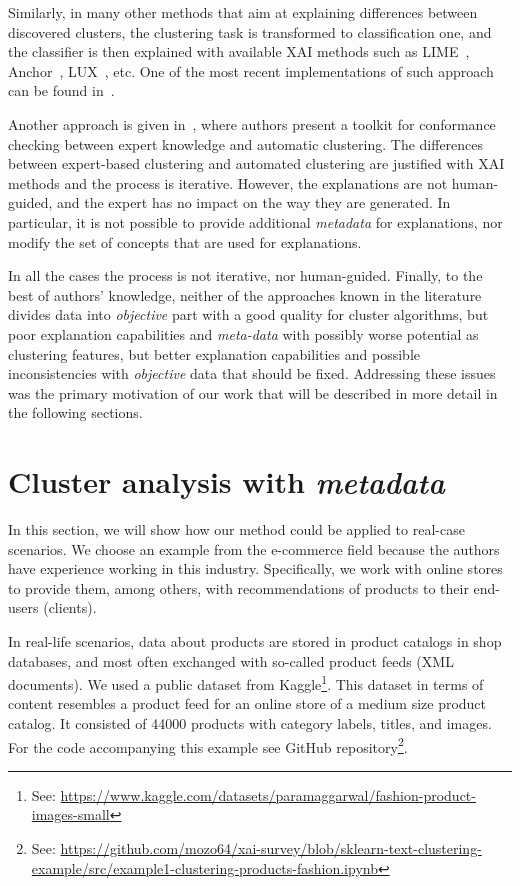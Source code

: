 \documentclass[
 twocolumn,
 hf,
]{ceurart}
\begin{document}
Similarly, in many other methods that aim at explaining differences between discovered clusters, the clustering task is transformed to classification one, and the classifier is then explained with available XAI methods such as LIME~\cite{lime}, Anchor~\cite{anchor}, LUX~\cite{lux2021iccs}, etc.
One of the most recent implementations of such approach can be found in~\cite{xaiclust2021}.

Another approach is given in~\cite{knac2021arxiv}, where authors present a toolkit for conformance checking between expert knowledge and automatic clustering.
The differences between expert-based clustering and automated clustering are justified with XAI methods and the process is iterative.
However, the explanations are not human-guided, and the expert has no impact on the way they are generated.
In particular, it is not possible to provide additional \textit{metadata} for explanations, nor modify the set of concepts that are used for explanations.

In all the cases the process is not iterative, nor human-guided.
Finally, to the best of authors' knowledge, neither of the approaches known in the literature divides data into \textit{objective} part with a good quality for cluster algorithms, but poor explanation capabilities and \textit{meta-data} with possibly worse potential as clustering features, but better explanation capabilities and possible inconsistencies with \textit{objective} data that should be fixed.
Addressing these issues was the primary motivation of our work that will be described in more detail in the following sections.

\section{Cluster analysis with \textit{metadata}}
\label{sec:clumeta}
In this section, we will show how our method could be applied to real-case scenarios.
We choose an example from the e-commerce field because the authors have experience working in this industry.
Specifically, we work with online stores to provide them, among others, with recommendations of products to their end-users (clients).

In real-life scenarios, data about products are stored in product catalogs in shop databases, and most often exchanged with so-called product feeds (XML documents).
We used a public dataset from Kaggle\footnote{See: \url{https://www.kaggle.com/datasets/paramaggarwal/fashion-product-images-small}}.
This dataset in terms of content resembles a product feed for an online store of a medium size product catalog.
It consisted of 44000 products with category labels, titles, and images.
For the code accompanying this example see GitHub repository\footnote{See: \url{https://github.com/mozo64/xai-survey/blob/sklearn-text-clustering-example/src/example1-clustering-products-fashion.ipynb}}.
\end{document}
